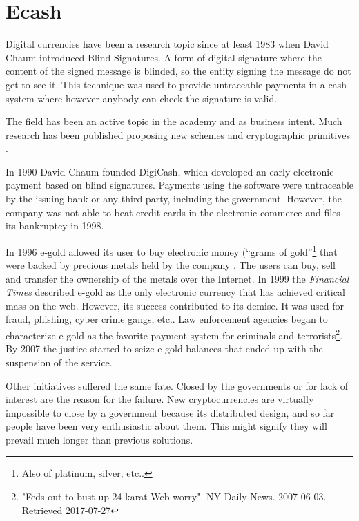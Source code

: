 \section{Ecash}
Digital currencies have been a research topic since at least 1983 when David
  Chaum \cite{chaum1983blind} introduced Blind Signatures. A form of digital
  signature where the content of the signed message is blinded, so the entity
  signing the message do not get to see it. This technique was used to provide
  untraceable payments in a cash system where however anybody can check the
  signature is valid.

The field has been an active topic in the academy and as business intent.
  Much research has been published proposing new schemes and
  cryptographic primitives \cite{okamoto1991universal}\cite{chaum1992achieving}
  \cite{boly1994esprit}\cite{anderson1996netcard}\cite{lysyanskaya1998group}.

In 1990 David Chaum founded DigiCash, which developed an early electronic
  payment based on blind signatures. Payments using the software were
  untraceable by the issuing bank or any third party, including the government.
However, the company was not able to beat credit cards in the electronic
  commerce and files its bankruptcy in 1998.

In 1996 e-gold allowed its user to buy electronic money (``grams of
  gold''\footnote{Also of platinum, silver, etc..} that were backed by precious
  metals held by the company \cite{hughes2007developments}.
The users can buy, sell and transfer the ownership of the metals over the
  Internet. In 1999 the \textit{Financial Times} described e-gold as the only
  electronic currency that has achieved critical mass on the web.
However, its success contributed to its demise. It was used for fraud, phishing,
  cyber crime gangs, etc.. Law enforcement agencies began to characterize
  e-gold as the favorite payment system for criminals and terrorists\footnote{%
  "Feds out to bust up 24-karat Web worry". NY Daily News. 2007-06-03. Retrieved
  2017-07-27}. By 2007 the justice started to seize e-gold balances that ended up
  with the suspension of the service.

Other initiatives suffered the same fate.
Closed by the governments or for lack of interest are the reason for the
  failure.
New cryptocurrencies are virtually impossible to close by a government because
  its distributed design, and so far people have been very enthusiastic about
  them.
This might signify they will prevail much longer than previous solutions.
